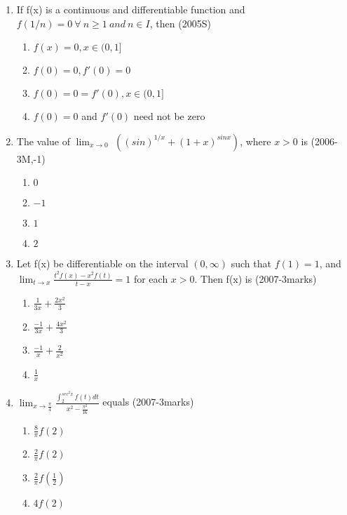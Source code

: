 \documentclass[journal,12pt,twocolumn]{IEEEtran}
\theoremstyle{remark}
\begin{document}
\begin{enumerate}
\item %

If f(x) is a continuous and differentiable function and $f(1/n)=0\ \forall\ n\geq1\ and\ n\in I$, then   \hfill{(2005S)}
    \begin{enumerate}
     \item $f(x)=0,x\in(0,1]$
     \item $f(0)=0,f'(0)=0$
     \item $f(0)=0=f'(0), x\in(0,1]$
     \item $f(0)=0$ and $f'(0)$ need not be zero\\
    \end{enumerate}


\item %

The value of $\lim_{x \to 0}$ $\left( (sin)^{1/x} + (1+x)^{sinx}\right)$, where $x > 0$ is \hfill{(2006-3M,-1)}
    \begin{enumerate}
     \item $0$
     \item $-1$
     \item $1$
     \item  $2$\\
    \end{enumerate}


\item %

Let f(x) be differentiable on the interval $(0,\infty)$ such that $f(1)=1$, and $\lim_{t \to x} \frac{t^2f(x)-x^2f(t)}{t-x}=1$ for each $x>0$. Then f(x) is \hfill{(2007-3marks)}
    \begin{enumerate}
     \item $\frac{1}{3x}+\frac{2x^2}{3}$\\
     \item $\frac{-1}{3x}+\frac{4x^2}{3}$\\
     \item $\frac{-1}{x}+\frac{2}{x^2}$\\
     \item $\frac{1}{x}$\\
    \end{enumerate}


\item %

$\lim_{x \to \frac{\pi}{4}}$$ \displaystyle \frac{\int_2^{sec^2x} f(t) dt}{x^2-\frac{\pi^2}{16}}$ equals \hfill{(2007-3marks)}
    \begin{enumerate}
     \item $\frac{8}{\pi}f(2)$
     \item $\frac{2}{\pi}f(2)$
     \item $\frac{2}{\pi}f(\frac{1}{2})$
     \item $4f(2)$\\
    \end{enumerate}


\end{enumerate}
\end{document}
